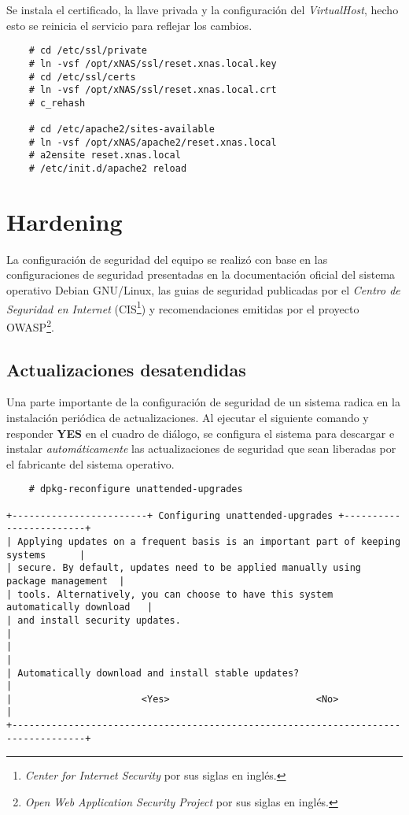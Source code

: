 Se instala el certificado, la llave privada y la configuraci\'{o}n del \emph{\gls{VirtualHost}}, hecho esto se reinicia el servicio para reflejar los cambios.

{
\scriptsize
\linespread{1}
\begin{verbatim}
    # cd /etc/ssl/private
    # ln -vsf /opt/xNAS/ssl/reset.xnas.local.key
    # cd /etc/ssl/certs
    # ln -vsf /opt/xNAS/ssl/reset.xnas.local.crt
    # c_rehash

    # cd /etc/apache2/sites-available
    # ln -vsf /opt/xNAS/apache2/reset.xnas.local
    # a2ensite reset.xnas.local
    # /etc/init.d/apache2 reload
\end{verbatim}
}

    \section {Hardening}

La configuraci\'{o}n de seguridad del equipo se realiz\'{o} con base en las configuraciones de seguridad presentadas en la documentaci\'{o}n oficial del sistema operativo Debian \textsc{GNU}/Linux\cite{_securing_????}, las guias de seguridad publicadas por el \emph{Centro de Seguridad en Internet} (\textsc{\gls{CIS}}\footnote{\emph{Center for Internet Security} por sus siglas en ingl\'{e}s.})\cite{_center_????} y recomendaciones emitidas por el proyecto \textsc{\gls{OWASP}}\footnote{\emph{Open Web Application Security Project} por sus siglas en ingl\'{e}s.}\cite{_scg_????}.

      \subsection {Actualizaciones desatendidas}

Una parte importante de la configuraci\'{o}n de seguridad de un sistema radica en la instalaci\'{o}n peri\'{o}dica de actualizaciones. Al ejecutar el siguiente comando y responder \textbf{YES} en el cuadro de di\'{a}logo, se configura el sistema para descargar e instalar \emph{autom\'{a}ticamente} las actualizaciones de seguridad que sean liberadas por el fabricante del sistema operativo.

{
\scriptsize
\linespread{1}
\begin{verbatim}
    # dpkg-reconfigure unattended-upgrades

+------------------------+ Configuring unattended-upgrades +------------------------+
| Applying updates on a frequent basis is an important part of keeping systems      |
| secure. By default, updates need to be applied manually using package management  |
| tools. Alternatively, you can choose to have this system automatically download   |
| and install security updates.                                                     |
|                                                                                   |
| Automatically download and install stable updates?                                |
|                       <Yes>                          <No>                         |
+-----------------------------------------------------------------------------------+
\end{verbatim}
}

